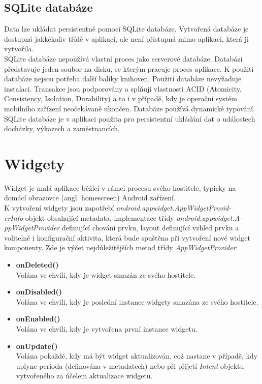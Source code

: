 \documentclass{diplomka}
\begin{document}
\subsection*{SQLite databáze}
Data lze ukládat persistentně pomocí SQLite\cite{sqlite} databáze. Vytvořená databáze je dostupná jakkékoliv třídě v aplikaci, ale není přístupná mimo aplikaci, která ji vytvořila. \\ \indent
SQLite databáze nepoužívá vlastní proces jako serverové databáze. Databázi představuje jeden soubor na disku, se kterým pracuje proces aplikace. K použití databáze nejsou potřeba další balíky knihoven. Použití databáze nevyžaduje instalaci. Transakce jsou podporovány a splňují vlastnosti ACID (Atomicity, Consistency, Isolation, Durability) a to i v případě, kdy je operační systém mobilního zařízení neočekávaně ukončen. Databáze používá dynamické typování. \\ \indent
SQLite databáze je v aplikaci použita pro persistentní ukládání dat o událostech docházky, výkazech a zaměstnancích.


\section{Widgety}
 Widget je malá aplikace běžící v rámci procesu svého hostitele, typicky na domácí obrazovce (angl. homescreen) Android zařízení. \cite{androidinaction}.\\ \indent
K vytvoření widgety jsou zapotřebí \emph{android.appwidget.AppWidgetProvid-\\erInfo} objekt obsahující metadata,  implementace třídy \emph{android.appwidget.A-\\ppWidgetProvider} definující chování prvku, layout definující vzhled prvku a 
volitelně i konfigurační aktivita, která bude spuštěna při vytvoření nové widget komponenty. 
Zde je výčet nejdůležitějších metod třídy \emph{AppWidgetProvider}:
\begin{itemize}[]
\item \textbf{onDeleted()}\\
Volána ve chvíli, kdy je widget smazán ze svého hostitele.
\item \textbf{onDisabled()}\\
Volána ve chvíli, kdy je poslední instance widgety smazána ze svého hostitele.
\item \textbf{onEnabled()}\\
Volána ve chvíli, kdy je vytvořena první instance widgetu.
\item \textbf{onUpdate()}\\
Volána pokaždé, kdy má být widget aktualizován, což nastane v případě, kdy uplyne perioda (definována v metadatech) nebo při přijetí \emph{Intent} objektu vytvořeného za účelem aktualizace widgetu. 
\end{itemize}
\end{document}
